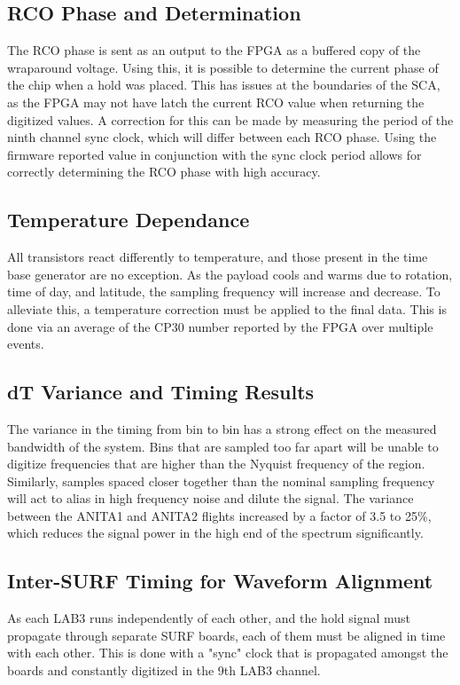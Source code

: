 	\subsection{RCO Phase and Determination}
		The RCO phase is sent as an output to the FPGA as a buffered copy of the wraparound voltage.  Using this, it is possible to determine the current phase of the chip when a hold was placed.  This has issues at the boundaries of the SCA, as the FPGA may not have latch the current RCO value when returning the digitized values.  A correction for this can be made by measuring the period of the ninth channel sync clock, which will differ between each RCO phase.  Using the firmware reported value in conjunction with the sync clock period allows for correctly determining the RCO phase with high accuracy.

	\subsection{Temperature Dependance}	
		All transistors react differently to temperature, and those present in the time base generator are no exception.  As the payload cools and warms due to rotation, time of day, and latitude, the sampling frequency will increase and decrease.  To alleviate this, a temperature correction must be applied to the final data. This is done via an average of the CP30 number reported by the FPGA over multiple events.
		
	\subsection{dT Variance and Timing Results}	
		The variance in the timing from bin to bin has a strong effect on the measured bandwidth of the system.  Bins that are sampled too far apart will be unable to digitize frequencies that are higher than the Nyquist frequency of the region.  Similarly, samples spaced closer together than the nominal sampling frequency will act to alias in high frequency noise and dilute the signal.  The variance between the ANITA1 and ANITA2 flights increased by a factor of 3.5 to 25\%, which reduces the signal power in the high end of the spectrum significantly.
		
	\subsection{Inter-SURF Timing for Waveform Alignment}	
		As each LAB3 runs independently of each other, and the hold signal must propagate through separate SURF boards, each of them must be aligned in time with each other.  This is done with a "sync" clock that is propagated amongst the boards and constantly digitized in the 9th LAB3 channel.



